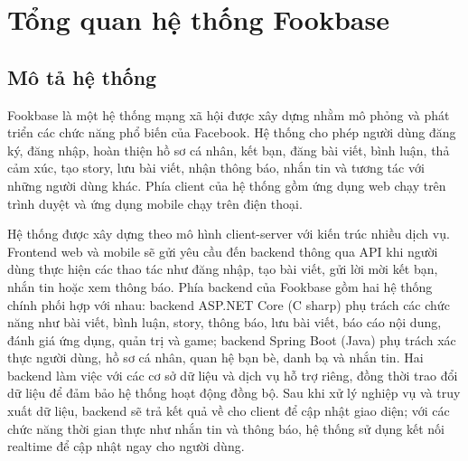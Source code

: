\documentclass[a4paper,12pt]{article}
\begin{document}
\section{Tổng quan hệ thống Fookbase}

\subsection{Mô tả hệ thống}
Fookbase là một hệ thống mạng xã hội được xây dựng nhằm mô phỏng và phát triển các chức năng phổ biến của Facebook. Hệ thống cho phép người dùng đăng ký, đăng nhập, hoàn thiện hồ sơ cá nhân, kết bạn, đăng bài viết, bình luận, thả cảm xúc, tạo story, lưu bài viết, nhận thông báo, nhắn tin và tương tác với những người dùng khác. Phía client của hệ thống gồm ứng dụng web chạy trên trình duyệt và ứng dụng mobile chạy trên điện thoại.

Hệ thống được xây dựng theo mô hình client-server với kiến trúc nhiều dịch vụ. Frontend web và mobile sẽ gửi yêu cầu đến backend thông qua API khi người dùng thực hiện các thao tác như đăng nhập, tạo bài viết, gửi lời mời kết bạn, nhắn tin hoặc xem thông báo. Phía backend của Fookbase gồm hai hệ thống chính phối hợp với nhau: backend ASP.NET Core (C sharp) phụ trách các chức năng như bài viết, bình luận, story, thông báo, lưu bài viết, báo cáo nội dung, đánh giá ứng dụng, quản trị và game; backend Spring Boot (Java) phụ trách xác thực người dùng, hồ sơ cá nhân, quan hệ bạn bè, danh bạ và nhắn tin. Hai backend làm việc với các cơ sở dữ liệu và dịch vụ hỗ trợ riêng, đồng thời trao đổi dữ liệu để đảm bảo hệ thống hoạt động đồng bộ. Sau khi xử lý nghiệp vụ và truy xuất dữ liệu, backend sẽ trả kết quả về cho client để cập nhật giao diện; với các chức năng thời gian thực như nhắn tin và thông báo, hệ thống sử dụng kết nối realtime để cập nhật ngay cho người dùng.
\end{document}
